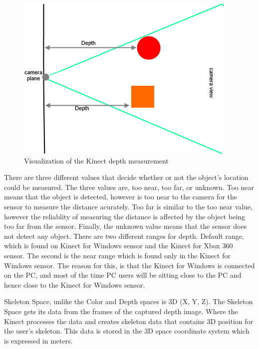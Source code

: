 \begin{figure}[!htbp]
\centering
\includegraphics{images/depthspace.png}
\caption{Visualization of the Kinect depth measurement}
\label{depthspace}
\end{figure}

There are three different values that decide whether or not the object's location could be measured. The three values are, too near, too far, or unknown. Too near means that the object is detected, however is too near to the camera for the sensor to measure the distance acurately. Too far is similar to the too near value, however the reliablity of measuring the distance is affected by the object being too far from the sensor. Finally, the unknown value means that the sensor does not detect any object. There are two different ranges for depth. Default range, which is found on Kinect for Windows sensor and the Kinect for Xbox 360 sensor. The second is the near range which is found only in the Kinect for Windows sensor. The reason for this, is that the Kinect for Windows is connected on the PC, and most of the time PC users will be sitting close to the PC and hence close to the Kinect for Windows sensor.


Skeleton Space, unlike the Color and Depth spaces is 3D (X, Y, Z). The Skeleton Space gets its data from the frames of the captured depth image. Where the Kinect processes the data and creates skeleton data that contains 3D position for the user's skeleton. This data is stored in the 3D space coordinate system which is expressed in meters.


